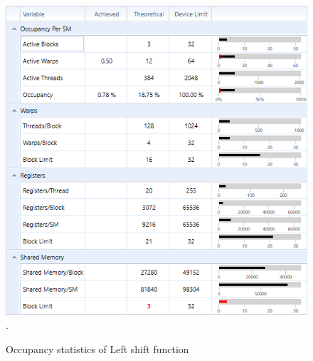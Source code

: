 \documentclass[oneside,openright,12pt,final,en]{mgr}
\begin{document}
\begin{figure}[H]
	\centering
	\includegraphics[width=\textwidth]{leftshift_occupancy}.
	\caption{Occupancy statistics of Left shift function}
	\label{fig:leftshift_occupancy}
\end{figure}
\end{document}

